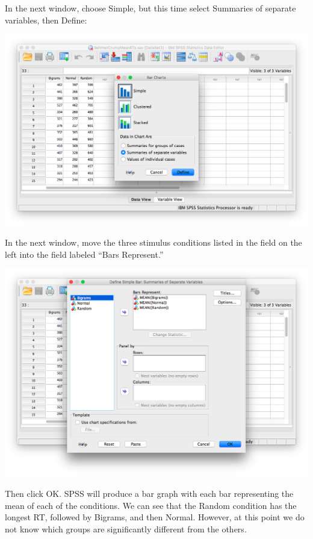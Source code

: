\documentclass[
]{book}
\begin{document}
In the next window, choose {Simple}, but this time select {Summaries of separate variables}, then {Define}:

\includegraphics{img/9.4.28.png}

In the next window, move the three stimulus conditions listed in the field on the left into the field labeled ``Bars Represent.''

\includegraphics{img/9.4.29.png}

Then click {OK}. SPSS will produce a bar graph with each bar representing the mean of each of the conditions. We can see that the Random condition has the longest RT, followed by Bigrams, and then Normal. However, at this point we do not know which groups are significantly different from the others.
\end{document}
